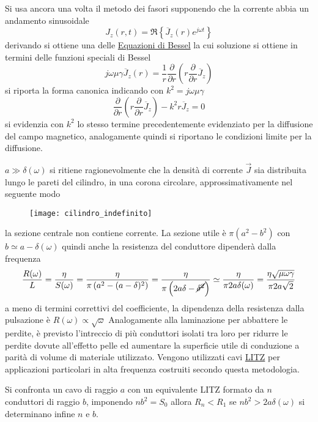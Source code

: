 Si usa ancora una volta il metodo dei fasori supponendo che la corrente abbia un andamento sinusoidale
$$
J_z(r,t) = \Re\left\{\overline{J}_z(r)e^{j\omega t} \right\}
$$
derivando si ottiene una delle \href{https://it.wikipedia.org/wiki/Equazioni_di_Bessel}{Equazioni di Bessel} la cui 
soluzione si ottiene in termini delle funzioni speciali di Bessel
$$
j\omega\mu\gamma \overline{J}_z(r) = \frac{1}{r} \frac{\partial}{\partial r} \left(r\frac{\partial}{\partial r} \overline{J}_z\right)
$$
si riporta la forma canonica indicando con $k^2 = j\omega\mu\gamma$
$$
\frac{\partial}{\partial r} \left(r\frac{\partial}{\partial r}\overline{J}_z\right) - k^2r\overline{J}_z = 0
$$
si evidenzia con $k^2$ lo stesso termine precedentemente evidenziato per la diffusione del campo magnetico,
analogamente quindi si riportano le condizioni limite per la diffusione.

$a\gg\delta(\omega)$ si ritiene ragionevolmente che la densità di corrente $\vec{J}$ sia distribuita 
lungo le pareti del cilindro, in una corona circolare, approssimativamente nel seguente modo
\begin{figure}[H]
\centering
\texttt{[image: cilindro\_indefinito]}
\end{figure}
la sezione centrale non contiene corrente. La sezione utile è $\pi\left(a^2-b^2\right)$ con $b\simeq a- \delta(\omega)$ quindi anche la resistenza del conduttore dipenderà dalla frequenza
$$
\frac{R(\omega)}{L} = \frac{\eta}{S(\omega)} = \frac{\eta}{\pi\left(a^2 - (a-\delta)^2\right)} = \frac{\eta}{\pi\left(2a\delta - \cancel{\delta^2}\right)} \simeq \frac{\eta}{\pi 2 a \delta(\omega)} = \frac{\eta\sqrt{\mu\omega\gamma}}{\pi 2 a \sqrt{2}}
$$
a meno di termini correttivi del coefficiente, la dipendenza della resistenza dalla pulsazione è $R(\omega)\propto \sqrt{\omega} $
Analogamente alla laminazione per abbattere le perdite, è previsto l'intreccio di più conduttori isolati tra loro
per ridurre le perdite dovute all'effetto pelle ed aumentare la superficie utile di conduzione a parità di volume di 
materiale utilizzato.
Vengono utilizzati cavi \href{https://it.wikipedia.org/wiki/Filo_litz}{LITZ} per applicazioni particolari in alta 
frequenza costruiti secondo questa metodologia.

Si confronta un cavo di raggio $a$ con un equivalente LITZ formato da $n$ conduttori di raggio $b$,
imponendo $nb^2 = S_0$ allora $R_n < R_1$ se $nb^2 > 2a\delta(\omega)$ si determinano infine $n$ e $b$.

